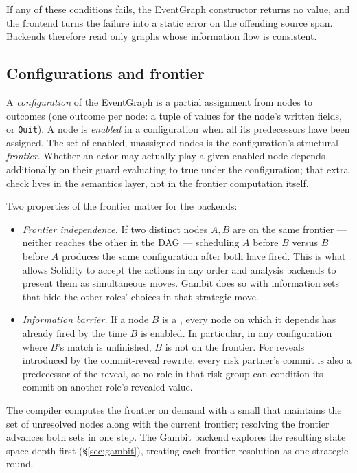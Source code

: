 If any of these conditions fails, the EventGraph constructor
returns no value, and the frontend turns the failure into a
static error on the offending source span.  Backends therefore
read only graphs whose information flow is consistent.

\subsection{Configurations and frontier}
\label{sec:eventgraph:frontier}

A \emph{configuration} of the EventGraph is a partial assignment
from nodes to outcomes (one outcome per node: a tuple of values
for the node's written fields, or \texttt{Quit}).  A node is
\emph{enabled} in a configuration when all its predecessors have
been assigned.  The set of enabled, unassigned nodes is the
configuration's structural \emph{frontier}.  Whether an actor
may actually play a given enabled node depends additionally on
their guard evaluating to true under the configuration; that
extra check lives in the semantics layer, not in the frontier
computation itself.

Two properties of the frontier matter for the backends:

\begin{itemize}\itemsep1pt
\item \emph{Frontier independence.}  If two distinct nodes $A, B$
  are on the same frontier --- neither reaches the other in the
  DAG --- scheduling $A$ before $B$ versus $B$ before $A$ produces
  the same configuration after both have fired.  This is what
  allows Solidity to accept the actions in any order and analysis
  backends to present them as simultaneous moves.  Gambit does so
  with information sets that hide the other roles' choices in that
  strategic move.
\item \emph{Information barrier.}  If a node $B$ is a \REVEAL,
  every node on which it depends has already fired by the time
  $B$ is enabled.  In particular, in any configuration where
  $B$'s match \COMMIT is unfinished, $B$ is not on the frontier.
  For reveals introduced by the commit-reveal rewrite, every
  risk partner's commit is also a predecessor of the reveal, so
  no role in that risk group can condition its commit on another
  role's revealed value.
\end{itemize}

The compiler computes the frontier on demand with a small
 that maintains the set of unresolved nodes
along with the current frontier; resolving the frontier advances
both sets in one step.  The Gambit backend explores the resulting
state space depth-first (\S\ref{sec:gambit}), treating each
frontier resolution as one strategic round.

